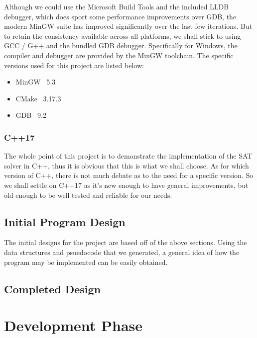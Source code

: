 \documentclass{article}
\begin{document}
Although we could use the Microsoft Build Tools and the included LLDB debugger, which does sport some performance improvements over GDB, the
modern MinGW suite has improved significantly over the last few iterations. But to retain the consistency available across all platforms,
we shall stick to using GCC / G++ and the bundled GDB debugger. Specifically for Windows, the compiler and debugger are provided by the
MinGW toolchain. 
The specific versions used for this project are listed below: 

\begin{itemize}
    \item MinGW \rightarrow\ 5.3
    \item CMake \rightarrow\ 3.17.3
    \item GDB \rightarrow\ 9.2
\end{itemize}

\subsubsection{C++17}
The whole point of this project is to demonstrate the implementation of the SAT solver in C++, thus it is obvious that this is what we shall
choose. As for which version of C++, there is not much debate as to the need for a specific version. So we shall settle on C++17 as it's new
enough to have general improvements, but old enough to be well tested and reliable for our needs. 

\subsection{Initial Program Design}
The initial designs for the project are based off of the above sections. Using the data structures and psuedocode that we generated, a
general idea of how the program may be implemented can be easily obtained. 

\subsection{Completed Design}

\newpage
\section{Development Phase}
\end{document}
